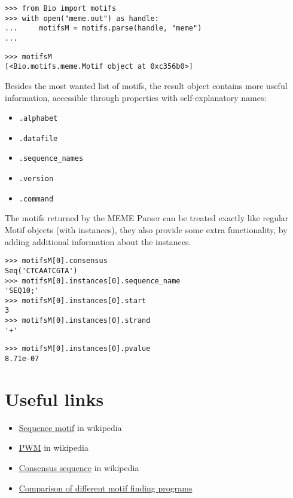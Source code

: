 \begin{verbatim}
>>> from Bio import motifs
>>> with open("meme.out") as handle:
...     motifsM = motifs.parse(handle, "meme")
...
\end{verbatim}
\begin{verbatim}
>>> motifsM
[<Bio.motifs.meme.Motif object at 0xc356b0>]
\end{verbatim}

Besides the most wanted list of motifs, the result object contains more useful information, accessible through properties with self-explanatory names:
\begin{itemize}
\item \verb|.alphabet|
\item \verb|.datafile|
\item \verb|.sequence_names|
\item \verb|.version|
\item \verb|.command|
\end{itemize}

The motifs returned by the MEME Parser can be treated exactly like regular
Motif objects (with instances), they also provide some extra
functionality, by adding additional information about the instances.

\begin{verbatim}
>>> motifsM[0].consensus
Seq('CTCAATCGTA')
>>> motifsM[0].instances[0].sequence_name
'SEQ10;'
>>> motifsM[0].instances[0].start
3
>>> motifsM[0].instances[0].strand
'+'
\end{verbatim}
\begin{verbatim}
>>> motifsM[0].instances[0].pvalue
8.71e-07
\end{verbatim}


\section{Useful links}
\label{sec:links}


\begin{itemize}
\item \href{https://en.wikipedia.org/wiki/Sequence_motif}{Sequence motif} in wikipedia
\item \href{https://en.wikipedia.org/wiki/Position_weight_matrix}{PWM} in wikipedia
\item \href{https://en.wikipedia.org/wiki/Consensus_sequence}{Consensus sequence} in wikipedia
\item \href{http://bio.cs.washington.edu/assessment/}{Comparison of different motif finding programs}
\end{itemize}


